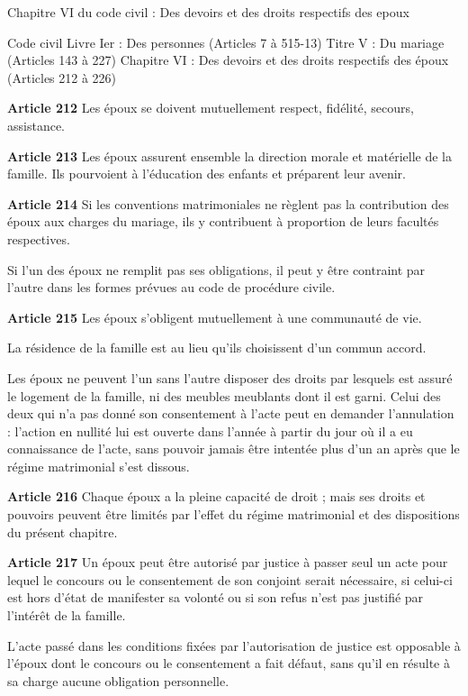 \documentclass[
  12pt,
]{book}
\begin{document}
\begin{encadre}{Chapitre VI du code civil : Des devoirs et des droits respectifs des epoux}


Code civil
Livre Ier : Des personnes (Articles 7 à 515-13)
Titre V : Du mariage (Articles 143 à 227)
Chapitre VI : Des devoirs et des droits respectifs des époux (Articles 212 à 226)

\textbf{Article 212}
Les époux se doivent mutuellement respect, fidélité, secours, assistance.

\textbf{Article 213}
Les époux assurent ensemble la direction morale et matérielle de la famille. Ils pourvoient à l'éducation des enfants et préparent leur avenir.

\textbf{Article 214}
Si les conventions matrimoniales ne règlent pas la contribution des époux aux charges du mariage, ils y contribuent à proportion de leurs facultés respectives.

Si l'un des époux ne remplit pas ses obligations, il peut y être contraint par l'autre dans les formes prévues au code de procédure civile.

\textbf{Article 215}
Les époux s'obligent mutuellement à une communauté de vie.

La résidence de la famille est au lieu qu'ils choisissent d'un commun accord.

Les époux ne peuvent l'un sans l'autre disposer des droits par lesquels est assuré le logement de la famille, ni des meubles meublants dont il est garni. Celui des deux qui n'a pas donné son consentement à l'acte peut en demander l'annulation : l'action en nullité lui est ouverte dans l'année à partir du jour où il a eu connaissance de l'acte, sans pouvoir jamais être intentée plus d'un an après que le régime matrimonial s'est dissous.

\textbf{Article 216}
Chaque époux a la pleine capacité de droit ; mais ses droits et pouvoirs peuvent être limités par l'effet du régime matrimonial et des dispositions du présent chapitre.

\textbf{Article 217}
Un époux peut être autorisé par justice à passer seul un acte pour lequel le concours ou le consentement de son conjoint serait nécessaire, si celui-ci est hors d'état de manifester sa volonté ou si son refus n'est pas justifié par l'intérêt de la famille.

L'acte passé dans les conditions fixées par l'autorisation de justice est opposable à l'époux dont le concours ou le consentement a fait défaut, sans qu'il en résulte à sa charge aucune obligation personnelle.


\end{encadre}
\end{document}
